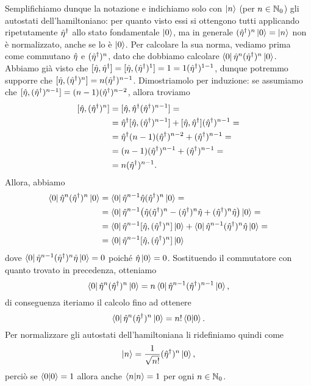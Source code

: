 Semplifichiamo dunque la notazione e indichiamo solo con $\left|{n}\right\rangle$ (per $n\in\mathbb{N}_0$) gli autostati dell'hamiltoniano: per quanto visto essi si ottengono tutti applicando ripetutamente ${\hat{\eta}}^\dagger$ allo stato fondamentale $\left|{0}\right\rangle$, ma in generale $({\hat{\eta}}^\dagger)^n\left|{0}\right\rangle=\left|{n}\right\rangle$ non è normalizzato, anche se lo è $\left|{0}\right\rangle$.
Per calcolare la sua norma, vediamo prima come commutano $\hat{\eta}$ e $({\hat{\eta}}^\dagger)^n$, dato che dobbiamo calcolare $\left\langle{0}\right|\hat{\eta}^n({\hat{\eta}}^\dagger)^n\left|{0}\right\rangle$.
Abbiamo già visto che $[\hat{\eta},{\hat{\eta}}^\dagger]=[\hat{\eta},({\hat{\eta}}^\dagger)^1]=1=1({\hat{\eta}}^\dagger)^{1-1}$, dunque potremmo supporre che $[\hat{\eta},({\hat{\eta}}^\dagger)^n]=n({\hat{\eta}}^\dagger)^{n-1}$.
Dimostriamolo per induzione: se assumiamo che $[\hat{\eta},({\hat{\eta}}^\dagger)^{n-1}]=(n-1)({\hat{\eta}}^\dagger)^{n-2}$, allora troviamo
\begin{equation}
	\begin{split}
		[\hat{\eta},({\hat{\eta}}^\dagger)^n]&=[\hat{\eta},{\hat{\eta}}^\dagger({\hat{\eta}}^\dagger)^{n-1}]=\\
		&={\hat{\eta}}^\dagger[\hat{\eta},({\hat{\eta}}^\dagger)^{n-1}]+[\hat{\eta},{\hat{\eta}}^\dagger]({\hat{\eta}}^\dagger)^{n-1}=\\
		&={\hat{\eta}}^\dagger(n-1)({\hat{\eta}}^\dagger)^{n-2}+({\hat{\eta}}^\dagger)^{n-1}=\\
		&=(n-1)({\hat{\eta}}^\dagger)^{n-1}+({\hat{\eta}}^\dagger)^{n-1}=\\
		&=n({\hat{\eta}}^\dagger)^{n-1}.
	\end{split}
\end{equation}
Allora, abbiamo
\begin{equation}
	\begin{split}
		\left\langle{0}\right|\hat{\eta}^n({\hat{\eta}}^\dagger)^n\left|{0}\right\rangle&=\left\langle{0}\right|\hat{\eta}^{n-1}\hat{\eta}({\hat{\eta}}^\dagger)^n\left|{0}\right\rangle=\\
		&=\left\langle{0}\right|\hat{\eta}^{n-1}\big(\hat{\eta}({\hat{\eta}}^\dagger)^n-({\hat{\eta}}^\dagger)^n\hat{\eta}+({\hat{\eta}}^\dagger)^n\hat{\eta}\big)\left|{0}\right\rangle=\\
		&=\left\langle{0}\right|\hat{\eta}^{n-1}[\hat{\eta},({\hat{\eta}}^\dagger)^n]\left|{0}\right\rangle+\left\langle{0}\right|\hat{\eta}^{n-1}({\hat{\eta}}^\dagger)^n\hat{\eta}\left|{0}\right\rangle=\\
		&=\left\langle{0}\right|\hat{\eta}^{n-1}[\hat{\eta},({\hat{\eta}}^\dagger)^n]\left|{0}\right\rangle
	\end{split}
\end{equation}
dove $\left\langle{0}\right|\hat{\eta}^{n-1}({\hat{\eta}}^\dagger)^n\hat{\eta}\left|{0}\right\rangle=0$ poich\'e $\hat{\eta}\left|{0}\right\rangle=0$.
Sostituendo il commutatore con quanto trovato in precedenza, otteniamo
\begin{equation}
	\left\langle{0}\right|\hat{\eta}^n({\hat{\eta}}^\dagger)^n\left|{0}\right\rangle=n\left\langle{0}\right|\hat{\eta}^{n-1}({\hat{\eta}}^\dagger)^{n-1}\left|{0}\right\rangle,
\end{equation}
di conseguenza iteriamo il calcolo fino ad ottenere
\begin{equation}
	\left\langle{0}\right|\hat{\eta}^n({\hat{\eta}}^\dagger)^n\left|{0}\right\rangle=n!\left\langle{0}\middle|{0}\right\rangle.
\end{equation}
Per normalizzare gli autostati dell'hamiltoniana li ridefiniamo quindi come
\begin{equation}
	\left|{n}\right\rangle=\frac1{\sqrt{n!}}({\hat{\eta}}^\dagger)^n\left|{0}\right\rangle,
	\label{eq:oscillatore-armonico-autostati-ortonormali}
\end{equation}
perciò se $\left\langle{0}\middle|{0}\right\rangle=1$ allora anche $\left\langle{n}\middle|{n}\right\rangle=1$ per ogni $n\in\mathbb{N}_0$.

